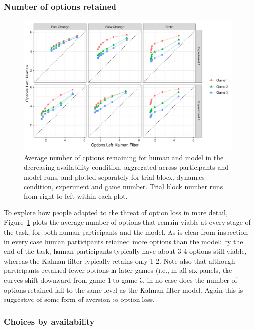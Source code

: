 \documentclass[a4paper,doc,natbib]{apa6}
\begin{document}
\subsubsection{Number of options retained}

\begin{figure}[t]
\centering
\includegraphics[width=.9\textwidth]{modelvshuman_optleft.pdf}
\caption{\small{Average number of options remaining for human and model in the decreasing availability condition, aggregated across participants and model runs, and plotted separately for trial block, dynamics condition, experiment and game number. Trial block number runs from right to left within each plot.}}
\label{fig:modelhuman_nopts}
\end{figure}

To explore how people adapted to the threat of option loss in more detail, Figure~\ref{fig:modelhuman_nopts} plots the average number of options that remain viable at every stage of the task, for both human participants and the model. As is clear from inspection in every case human participants retained more options than the model: by the end of the task, human participants typically have about 3-4 options still viable, whereas the Kalman filter typically retains only 1-2. Note also that although participants retained fewer options in later games (i.e., in all six panels, the curves shift downward from game 1 to game 3, in no case does the number of options retained fall to the same level as the Kalman filter model. Again this is suggestive of some form of aversion to option loss.


\subsubsection{Choices by availability}
\end{document}

